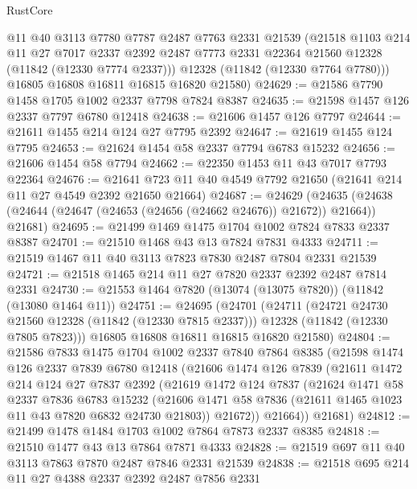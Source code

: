 \begin{lexlean}{RustCore}
\begin{coremodule}
        @11
        @40
        @3113
        @7780
        @7787
        @2487
        @7763
        @2331
        @21539
        (@21518
          @1103
          @214
          @11
          @27
          @7017
          @2337
          @2392
          @2487
          @7773
          @2331
          @22364
          @21560
          @12328
          (@11842 (@12330 @7774 @2337)))
        @12328
        (@11842 (@12330 @7764 @7780)))
      @16805
      @16808
      @16811
      @16815
      @16820
      @21580)
@24629 := @21586 @7790 @1458 @1705 @1002 @2337 @7798 @7824 @8387
@24635 := @21598 @1457 @126 @2337 @7797 @6780 @12418
@24638 := @21606 @1457 @126 @7797
@24644 := @21611 @1455 @214 @124 @27 @7795 @2392
@24647 := @21619 @1455 @124 @7795
@24653 := @21624 @1454 @58 @2337 @7794 @6783 @15232
@24656 := @21606 @1454 @58 @7794
@24662 := @22350 @1453 @11 @43 @7017 @7793 @22364
@24676 := @21641 @723 @11 @40 @4549 @7792 @21650 (@21641 @214 @11 @27 @4549 @2392 @21650 @21664)
@24687 := @24629
    (@24635 (@24638 (@24644 (@24647 (@24653 (@24656 (@24662 @24676)) @21672)) @21664)) @21681)
@24695 := @21499 @1469 @1475 @1704 @1002 @7824 @7833 @2337 @8387
@24701 := @21510 @1468 @43 @13 @7824 @7831 @4333
@24711 := @21519 @1467 @11 @40 @3113 @7823 @7830 @2487 @7804 @2331 @21539
@24721 := @21518 @1465 @214 @11 @27 @7820 @2337 @2392 @2487 @7814 @2331
@24730 := @21553 @1464 @7820 (@13074 (@13075 @7820)) (@11842 (@13080 @1464 @11))
@24751 := @24695
    (@24701
      (@24711
        (@24721 @24730 @21560 @12328 (@11842 (@12330 @7815 @2337)))
        @12328
        (@11842 (@12330 @7805 @7823)))
      @16805
      @16808
      @16811
      @16815
      @16820
      @21580)
@24804 := @21586
    @7833
    @1475
    @1704
    @1002
    @2337
    @7840
    @7864
    @8385
    (@21598
      @1474
      @126
      @2337
      @7839
      @6780
      @12418
      (@21606
        @1474
        @126
        @7839
        (@21611
          @1472
          @214
          @124
          @27
          @7837
          @2392
          (@21619
            @1472
            @124
            @7837
            (@21624
              @1471
              @58
              @2337
              @7836
              @6783
              @15232
              (@21606 @1471 @58 @7836 (@21611 @1465 @1023 @11 @43 @7820 @6832 @24730 @21803))
              @21672))
          @21664))
      @21681)
@24812 := @21499 @1478 @1484 @1703 @1002 @7864 @7873 @2337 @8385
@24818 := @21510 @1477 @43 @13 @7864 @7871 @4333
@24828 := @21519 @697 @11 @40 @3113 @7863 @7870 @2487 @7846 @2331 @21539
@24838 := @21518 @695 @214 @11 @27 @4388 @2337 @2392 @2487 @7856 @2331

\end{coremodule}
\end{lexlean}
